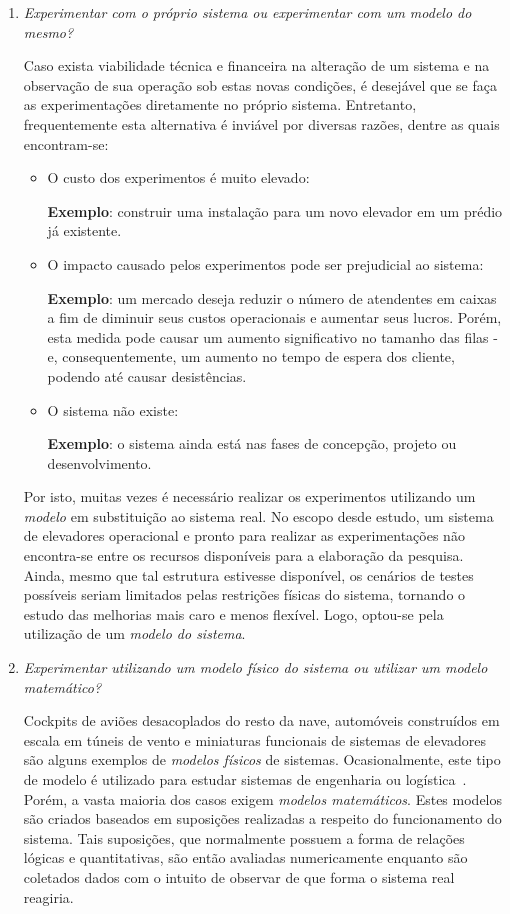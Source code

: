 \begin{enumerate}
\item \textit{Experimentar com o próprio sistema ou experimentar com um modelo do mesmo?}

Caso exista viabilidade técnica e financeira na alteração de um sistema e na
observação de sua operação sob estas novas condições, é desejável que se faça as
experimentações diretamente no próprio sistema. Entretanto, frequentemente esta
alternativa é inviável por diversas razões, dentre as quais encontram-se:

\begin{itemize}
  \item O custo dos experimentos é muito elevado:

  \textbf{Exemplo}: construir uma instalação para um novo elevador em um prédio
já existente.

  \item O impacto causado pelos experimentos pode ser prejudicial ao sistema:

  \textbf{Exemplo}: um mercado deseja reduzir o número de atendentes em caixas a
fim de diminuir seus custos operacionais e aumentar seus lucros. Porém, esta
medida pode causar um aumento significativo no tamanho das filas - e,
consequentemente, um aumento no tempo de espera dos cliente, podendo até causar
desistências.

  \item O sistema não existe:

  \textbf{Exemplo}: o sistema ainda está nas fases de concepção, projeto ou
desenvolvimento.

\end{itemize}

Por isto, muitas vezes é necessário realizar os experimentos utilizando um
\textit{modelo} em substituição ao sistema real. No escopo desde estudo, um
sistema de elevadores operacional e pronto para realizar as experimentações não
encontra-se entre os recursos disponíveis para a elaboração da pesquisa. Ainda,
mesmo que tal estrutura estivesse disponível, os cenários de testes possíveis
seriam limitados pelas restrições físicas do sistema, tornando o estudo das
melhorias mais caro e menos flexível. Logo, optou-se pela utilização de um
\textit{modelo do sistema}.

\item \textit{Experimentar utilizando um modelo físico do sistema ou utilizar um modelo
matemático?}

Cockpits de aviões desacoplados do resto da nave, automóveis construídos em
escala em túneis de vento e miniaturas funcionais de sistemas de elevadores são
alguns exemplos de \textit{modelos físicos} de sistemas. Ocasionalmente, este
tipo de modelo é utilizado para estudar sistemas de engenharia ou
logística~\cite{Law}. Porém, a vasta maioria dos casos exigem \textit{modelos
matemáticos}. Estes modelos são criados baseados em suposições realizadas a
respeito do funcionamento do sistema. Tais suposições, que normalmente possuem a
forma de relações lógicas e quantitativas, são então avaliadas numericamente
enquanto são coletados dados com o intuito de observar de que forma o sistema
real reagiria.


\end{enumerate}
